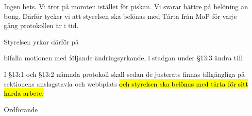 \documentclass[../_main/handlingar.tex]{subfiles}
\begin{document}
\motionssvar
Ingen hets. Vi tror på moroten istället för piskan. Vi svarar bättre på belöning än bong. Därför tycker vi att styrelsen ska belönas med Tårta från MoP för varje gång protokollen är i tid.

Styrelsen yrkar därför på

\begin{attsatser}
	\att bifalla motionen med följande ändringsyrkande,
	\att i stadgan under \S13:3 ändra till:\par
	I \S13:1 och \S13:2 nämnda protokoll skall sedan de justerats finnas
	tillgängliga på sektionens anslagstavla och webbplats \hl{och styrelsen ska belönas med tårta för sitt hårda arbete.}
	\changenote	
\end{attsatser}


\begin{signatures}{1}
	\ist
	\signature{Daniel Bakic}{Ordförande}
\end{signatures}
\end{document}
